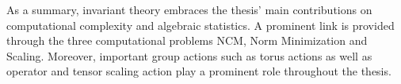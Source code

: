 \bigskip

As a summary, invariant theory embraces the thesis' main contributions on computational complexity and algebraic statistics. A prominent link is provided through the three computational problems NCM, Norm Minimization and Scaling. Moreover, important group actions such as torus actions as well as operator and tensor scaling action play a prominent role throughout the thesis.



%
%

